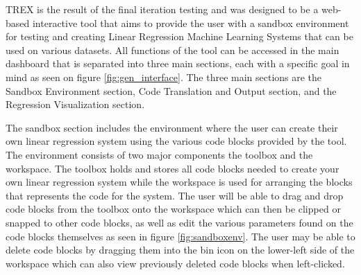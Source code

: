 \documentclass{sigchi}
\begin{document}
TREX is the result of the final iteration testing and was designed to be a web-based interactive tool that aims to provide the user with a sandbox environment for testing and creating Linear Regression Machine Learning Systems that can be used on various datasets. All functions of the tool can be accessed in the main dashboard that is separated into three main sections, each with a specific goal in mind as seen on figure \ref{fig:gen_interface}. The three main sections are the Sandbox Environment section, Code Translation and Output section, and the Regression Visualization section.

The sandbox section includes the environment where the user can create their own linear regression system using the various code blocks provided by the tool. The environment consists of two major components the toolbox and the workspace. The toolbox holds and stores all code blocks needed to create your own linear regression system while the workspace is used for arranging the blocks that represents the code for the system. The user will be able to drag and drop code blocks from the toolbox onto the workspace which can then be clipped or snapped to other code blocks, as well as edit the various parameters found on the code blocks themselves as seen in figure \ref{fig:sandboxenv}. The user may be able to delete code blocks by dragging them into the bin icon on the lower-left side of the workspace which can also view previously deleted code blocks when left-clicked.
\end{document}

